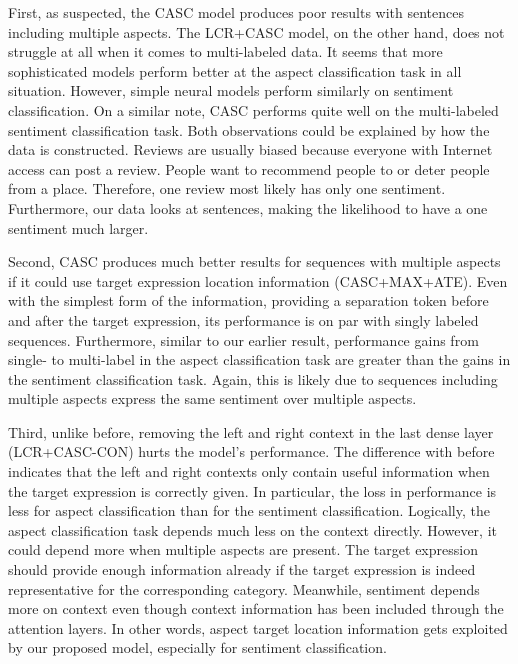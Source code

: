 \documentclass[american, oneside]{ecsgdp}
\begin{document}
First, as suspected, the CASC model produces poor results with sentences including multiple aspects. The LCR+CASC model, on the other hand, does not struggle at all when it comes to multi-labeled data. It seems that more sophisticated models perform better at the aspect classification task in all situation. However, simple neural models perform similarly on sentiment classification. On a similar note, CASC performs quite well on the multi-labeled sentiment classification task. Both observations could be explained by how the data is constructed. Reviews are usually biased because everyone with Internet access can post a review. People want to recommend people to or deter people from a place. Therefore, one review most likely has only one sentiment. Furthermore, our data looks at sentences, making the likelihood to have a one sentiment much larger.

Second, CASC produces much better results for sequences with multiple aspects if it could use target expression location information (CASC+MAX+ATE). Even with the simplest form of the information, providing a separation token before and after the target expression, its performance is on par with singly labeled sequences. Furthermore, similar to our earlier result, performance gains from single- to multi-label in the aspect classification task are greater than the gains in the sentiment classification task. Again, this is likely due to sequences including multiple aspects express the same sentiment over multiple aspects.


Third, unlike before, removing the left and right context in the last dense layer (LCR+CASC-CON) hurts the model's performance. The difference with before indicates that the left and right contexts only contain useful information when the target expression is correctly given. In particular, the loss in performance is less for aspect classification than for the sentiment classification. %
Logically, the aspect classification task depends much less on the context directly. However, it could depend more when multiple aspects are present. The target expression should provide enough information already if the target expression is indeed representative for the corresponding category. Meanwhile, sentiment depends more on context even though context information has been included through the attention layers. In other words, aspect target location information gets exploited by our proposed model, especially for sentiment classification.
\end{document}
